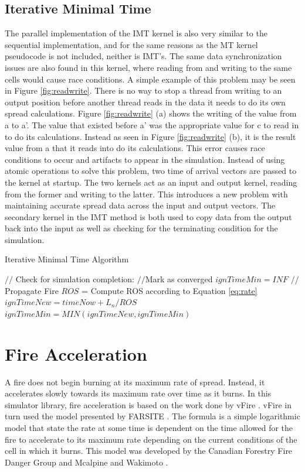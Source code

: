 \subsection{Iterative Minimal Time}
The parallel implementation of the IMT kernel is also very similar to the sequential implementation, and for the same reasons as the MT kernel pseudocode is not included, neither is IMT's. The same data synchronization issues are also found in this kernel, where reading from and writing to the same cells would cause race conditions. A simple example of this problem may be seen in Figure \ref{fig:readwrite}. There is no way to stop a thread from writing to an output position before another thread reads in the data it needs to do its own spread calculations. Figure \ref{fig:readwrite} (a) shows the writing of the value from a to a'. The value that existed before a' was the appropriate value for c to read in to do its calculations. Instead as seen in Figure \ref{fig:readwrite} (b), it is the result value from a that it reads into do its calculations. This error causes race conditions to occur and artifacts to appear in the simulation. Instead of using atomic operations to solve this problem, two time of arrival vectors are passed to the kernel at startup. The two kernels act as an input and output kernel, reading from the former and writing to the latter. This introduces a new problem with maintaining accurate spread data across the input and output vectors. The secondary kernel in the IMT method is both used to copy data from the output back into the input as well as checking for the terminating condition for the simulation. 

\begin{algorithm}[H]
  \caption{Iterative Minimal Time Algorithm}
  \label{alg:IMT}
  \begin{algorithmic}
  \STATE $//$ Check for simulation completion:
  \STATE $//$Mark as converged
  \ENDIF
  \STATE $ignTimeMin = INF$
  \STATE $//$Propagate Fire
  \STATE $ROS$ = Compute ROS according to Equation \ref{eq:rate}
  \STATE $ignTimeNew = timeNow + L_n / ROS$
  \STATE $ignTimeMin = MIN(ignTimeNew, ignTimeMin)$
  \ENDFOR
  \ENDIF
  \ENDFOR
  \end{algorithmic}
\end{algorithm}

\section{Fire Acceleration}
A fire does not begin burning at its maximum rate of spread. Instead, it accelerates slowly towards its maximum rate over time as it burns. In this simulator library, fire acceleration is based on the work done by vFire \cite{vFire}. vFire in turn used the model presented by FARSITE \cite{FARSITE}. The formula is a simple logarithmic model that state the rate at some time is dependent on the time allowed for the fire to accelerate to its maximum rate depending on the current conditions of the cell in which it burns. This model was developed by the Canadian Forestry Fire Danger Group and Mcalpine and Wakimoto \cite{accel_canada}\cite{accel_mcalpine}. 


